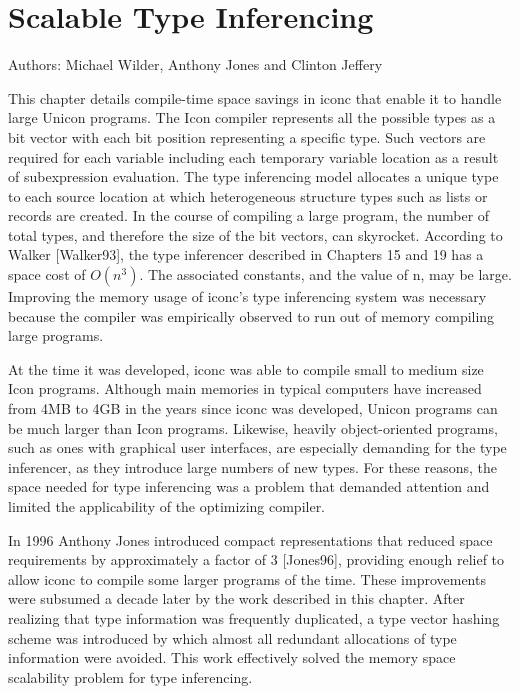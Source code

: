 \chapter{Scalable Type Inferencing}

Authors: Michael Wilder, Anthony Jones and Clinton Jeffery

\bigskip

This chapter details compile-time space savings in iconc that enable
it to handle large Unicon programs.  The Icon compiler represents all
the possible types as a bit vector with each bit position representing
a specific type. Such vectors are required for each variable including
each temporary variable location as a result of subexpression
evaluation. The type inferencing model allocates a unique type to each
source location at which heterogeneous structure types such as lists
or records are created.  In the course of compiling a large program,
the number of total types, and therefore the size of the bit vectors,
can skyrocket. According to Walker [Walker93],
the type inferencer described in Chapters
15 and 19 has a space cost of $O(n^{3})$.
The associated constants, and the value of n, may be
large. Improving the memory usage of iconc's type inferencing system
was necessary because the compiler was empirically observed to run out
of memory compiling large programs.

At the time it was developed, iconc was able to compile small to
medium size Icon programs. Although main memories in typical computers
have increased from 4MB to 4GB in the years since iconc was developed,
Unicon programs can be much larger than Icon programs. Likewise,
heavily object-oriented programs, such as ones with graphical user
interfaces, are especially demanding for the type inferencer, as they
introduce large numbers of new types. For these reasons, the space
needed for type inferencing was a problem that demanded attention
and limited the applicability of the optimizing compiler.

In 1996 Anthony Jones introduced compact representations that reduced
space requirements by approximately a factor of 3 [Jones96],
providing enough relief to allow iconc to compile some larger programs
of the time.  These improvements were subsumed a decade later by the
work described in this chapter. After realizing that type information
was frequently duplicated, a type vector hashing scheme was introduced
by which almost all redundant allocations of type information were
avoided. This work effectively solved the memory space scalability
problem for type inferencing.


